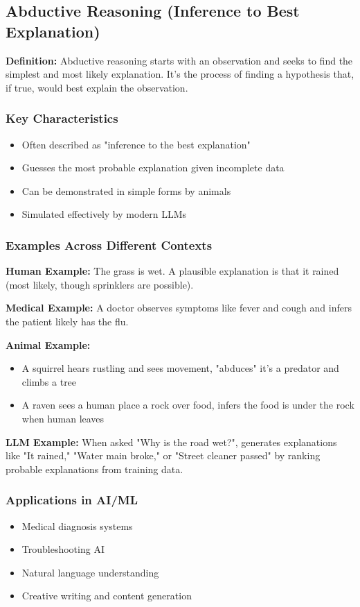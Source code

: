 \subsection{Abductive Reasoning (Inference to Best Explanation)}
\textbf{Definition:} Abductive reasoning starts with an observation and seeks to find the simplest and most likely explanation. It's the process of finding a hypothesis that, if true, would best explain the observation.

\subsubsection{Key Characteristics}
\begin{itemize}
    \item Often described as "inference to the best explanation"
    \item Guesses the most probable explanation given incomplete data
    \item Can be demonstrated in simple forms by animals
    \item Simulated effectively by modern LLMs
\end{itemize}

\subsubsection{Examples Across Different Contexts}
\textbf{Human Example:} The grass is wet. A plausible explanation is that it rained (most likely, though sprinklers are possible).

\textbf{Medical Example:} A doctor observes symptoms like fever and cough and infers the patient likely has the flu.

\textbf{Animal Example:}
\begin{itemize}
    \item A squirrel hears rustling and sees movement, "abduces" it's a predator and climbs a tree
    \item A raven sees a human place a rock over food, infers the food is under the rock when human leaves
\end{itemize}

\textbf{LLM Example:} When asked "Why is the road wet?", generates explanations like "It rained," "Water main broke," or "Street cleaner passed" by ranking probable explanations from training data.

\subsubsection{Applications in AI/ML}
\begin{itemize}
    \item Medical diagnosis systems
    \item Troubleshooting AI
    \item Natural language understanding
    \item Creative writing and content generation
\end{itemize}

